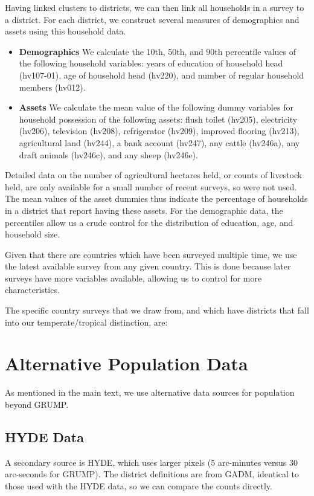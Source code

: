\documentclass[11pt]{article}
\begin{document}
Having linked clusters to districts, we can then link all households in a survey to a district. For each district, we construct several measures of demographics and assets using this household data. 
\begin{itemize}
    \item \textbf{Demographics} We calculate the 10th, 50th, and 90th percentile values of the following household variables: years of education of household head (hv107-01), age of household head (hv220), and number of regular household members (hv012).
    \item \textbf{Assets} We calculate the mean value of the following dummy variables for household possession of the following assets: flush toilet (hv205), electricity (hv206), television (hv208), refrigerator (hv209), improved flooring (hv213), agricultural land (hv244), a bank account (hv247), any cattle (hv246a), any draft animals (hv246c), and any sheep (hv246e). 
\end{itemize}

Detailed data on the number of agricultural hectares held, or counts of livestock held, are only available for a small number of recent surveys, so were not used. The mean values of the asset dummies thus indicate the percentage of households in a district that report having these assets. For the demographic data, the percentiles allow us a crude control for the distribution of education, age, and household size.

Given that there are countries which have been surveyed multiple time, we use the latest available survey from any given country. This is done because later surveys have more variables available, allowing us to control for more characteristics.

The specific country surveys that we draw from, and which have districts that fall into our temperate/tropical distinction, are:
 

\section{Alternative Population Data}
As mentioned in the main text, we use alternative data sources for population beyond GRUMP.

\subsection{HYDE Data}
A secondary source is HYDE, which uses larger pixels (5 arc-minutes versus 30 arc-seconds for GRUMP). The district definitions are from GADM, identical to those used with the HYDE data, so we can compare the counts directly.
\end{document}
